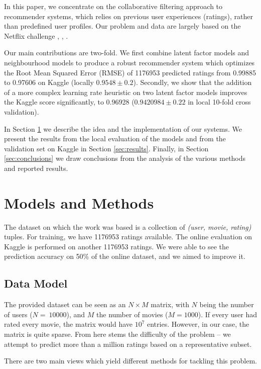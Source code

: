 \documentclass[10pt,conference,compsocconf]{IEEEtran}
\begin{document}
	In this paper, we concentrate on the collaborative filtering approach to recommender systems, which relies on previous user experiences (ratings), rather than predefined user profiles. Our problem and data are largely based on the Netflix challenge \cite{SMH07}, \cite{Koren09matrixfactorization}, \cite{funk2011netflix}.
	
	Our main contributions are two-fold. We first combine latent factor models and neighbourhood models to produce a robust recommender system which optimizes the Root Mean Squared Error (RMSE) of 1176953 predicted ratings from  0.99885 to 0.97606 on Kaggle (locally $0.9548\pm0.2$). Secondly, we show that the addition of a more complex learning rate heuristic on two latent factor models improves the Kaggle score significantly, to 0.96928 ($0.9420984\pm{0.22}$ in local 10-fold cross validation).
	
	In Section \ref{sec:models} we describe the idea and the implementation of our systems. We present the results from the local evaluation of the models and from the validation set on Kaggle in Section \ref{sec:results}. Finally, in Section \ref{sec:conclusions} we draw conclusions from the analysis of the various methods and reported results.
	
	
	\section{Models and Methods}
	\label{sec:models}
	The dataset on which the work was based is a collection of \emph{(user, movie, rating)} tuples. For training, we have 1176953 ratings available. The online evaluation on Kaggle is performed on another 1176953 ratings. We were able to see the prediction accuracy on 50\% of the online dataset, and we aimed to improve it.
	\subsection{Data Model}
	
	The provided dataset can be seen as an $N\times M$ matrix, with $N$ being the number of users ($N=~10000$), and $M$ the number of movies ($M=1000$). If every user had rated every movie, the matrix would have $10^7$ entries. However, in our case, the matrix is quite sparse. From here stems the difficulty of the problem -- we attempt to predict more than a million ratings based on a representative subset. 
	
	There are two main views which yield different methods for tackling this problem.
	
\end{document}
